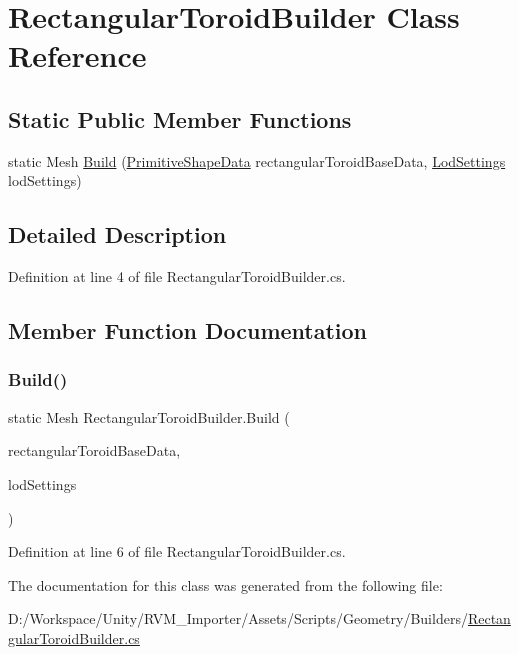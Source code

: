 \hypertarget{class_rectangular_toroid_builder}{}\section{Rectangular\+Toroid\+Builder Class Reference}
\label{class_rectangular_toroid_builder}
\subsection*{Static Public Member Functions}
\begin{DoxyCompactItemize}
\item 
static Mesh \mbox{\hyperlink{class_rectangular_toroid_builder_a79056965bb8f5c2022f2167d1d97eb24}{Build}} (\mbox{\hyperlink{class_primitive_shape_data}{Primitive\+Shape\+Data}} rectangular\+Toroid\+Base\+Data, \mbox{\hyperlink{class_lod_settings}{Lod\+Settings}} lod\+Settings)
\end{DoxyCompactItemize}


\subsection{Detailed Description}


Definition at line 4 of file Rectangular\+Toroid\+Builder.\+cs.



\subsection{Member Function Documentation}
\mbox{\label{class_rectangular_toroid_builder_a79056965bb8f5c2022f2167d1d97eb24}} 
\subsubsection{\texorpdfstring{Build()}{Build()}}
{\footnotesize\ttfamily static Mesh Rectangular\+Toroid\+Builder.\+Build (\begin{DoxyParamCaption}\item[{\mbox{\hyperlink{class_primitive_shape_data}{Primitive\+Shape\+Data}}}]{rectangular\+Toroid\+Base\+Data,  }\item[{\mbox{\hyperlink{class_lod_settings}{Lod\+Settings}}}]{lod\+Settings }\end{DoxyParamCaption})\hspace{0.3cm}{\ttfamily [static]}}



Definition at line 6 of file Rectangular\+Toroid\+Builder.\+cs.



The documentation for this class was generated from the following file\+:\begin{DoxyCompactItemize}
\item 
D\+:/\+Workspace/\+Unity/\+R\+V\+M\+\_\+\+Importer/\+Assets/\+Scripts/\+Geometry/\+Builders/\mbox{\hyperlink{_rectangular_toroid_builder_8cs}{Rectangular\+Toroid\+Builder.\+cs}}\end{DoxyCompactItemize}
